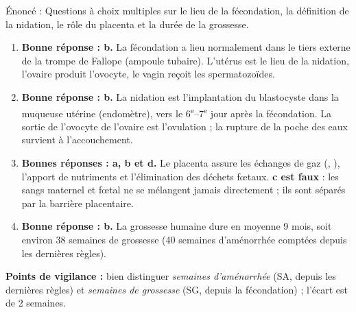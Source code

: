 \documentclass[11pt]{article}
\newcommand{\cle}[1]{{\popxbold\color{popdark}#1}}
\begin{document}
\begin{corrige}
Énoncé : Questions à choix multiples sur le lieu de la fécondation, la définition de la nidation, le rôle du placenta et la durée de la grossesse.
\tcblower
\begin{enumerate}
\item \textbf{Bonne réponse : b.} La fécondation a lieu normalement dans le \cle{tiers externe de la trompe de Fallope} (ampoule tubaire). L'utérus est le lieu de la nidation, l'ovaire produit l'ovocyte, le vagin reçoit les spermatozoïdes.
\item \textbf{Bonne réponse : b.} La \cle{nidation} est l'implantation du blastocyste dans la muqueuse utérine (endomètre), vers le 6\textsuperscript{e}--7\textsuperscript{e} jour après la fécondation. La sortie de l'ovocyte de l'ovaire est l'ovulation ; la rupture de la poche des eaux survient à l'accouchement.
\item \textbf{Bonnes réponses : a, b et d.} Le placenta assure les échanges de gaz (, ), l'apport de nutriments et l'élimination des déchets fœtaux. \textbf{c est faux} : les sangs maternel et fœtal ne se mélangent jamais directement ; ils sont séparés par la barrière placentaire.
\item \textbf{Bonne réponse : b.} La grossesse humaine dure en moyenne \cle{9 mois}, soit environ 38 semaines de grossesse (40 semaines d'aménorrhée comptées depuis les dernières règles).
\end{enumerate}
\textbf{Points de vigilance :} bien distinguer \emph{semaines d'aménorrhée} (SA, depuis les dernières règles) et \emph{semaines de grossesse} (SG, depuis la fécondation) ; l'écart est de 2 semaines.
\end{corrige}
\end{document}
